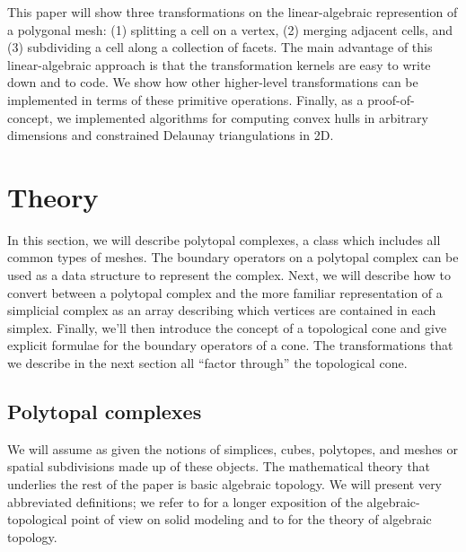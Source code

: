 \documentclass[twocolumn]{article}
\begin{document}
This paper will show three transformations on the linear-algebraic represention of a polygonal mesh: (1) splitting a cell on a vertex, (2) merging adjacent cells, and (3) subdividing a cell along a collection of facets.
The main advantage of this linear-algebraic approach is that the transformation kernels are easy to write down and to code.
We show how other higher-level transformations can be implemented in terms of these primitive operations.
Finally, as a proof-of-concept, we implemented algorithms for computing convex hulls in arbitrary dimensions and constrained Delaunay triangulations in 2D.



\section{Theory}

In this section, we will describe polytopal complexes, a class which includes all common types of meshes.
The boundary operators on a polytopal complex can be used as a data structure to represent the complex.
Next, we will describe how to convert between a polytopal complex and the more familiar representation of a simplicial complex as an array describing which vertices are contained in each simplex.
Finally, we'll then introduce the concept of a topological cone and give explicit formulae for the boundary operators of a cone.
The transformations that we describe in the next section all ``factor through'' the topological cone.

\subsection{Polytopal complexes}

We will assume as given the notions of simplices, cubes, polytopes, and meshes or spatial subdivisions made up of these objects.
The mathematical theory that underlies the rest of the paper is basic algebraic topology.
We will present very abbreviated definitions; we refer to \cite{dicarlo2007solid} for a longer exposition of the algebraic-topological point of view on solid modeling and to \cite{hatcher2002algebraic} for the theory of algebraic topology.
\end{document}
